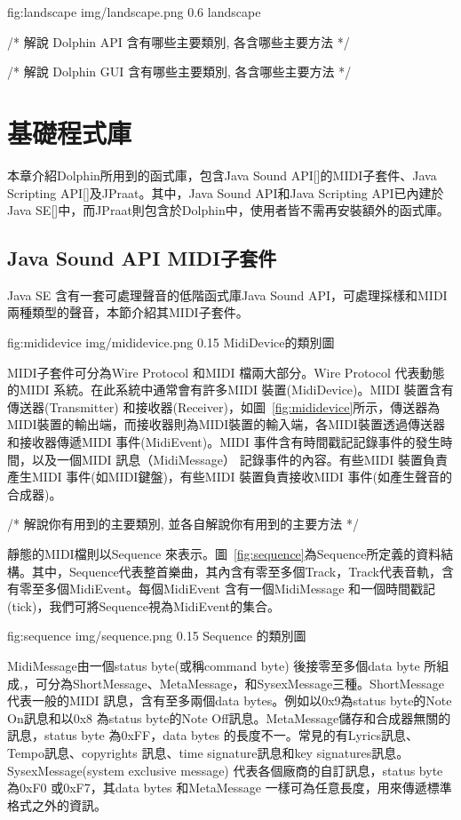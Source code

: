\documentclass[12pt,a4paper,oneside]{report}
\begin{document}
\figurewithcaption
{fig:landscape}
{img/landscape.png}
{0.6}
{landscape}


/* 
解說 Dolphin API 含有哪些主要類別, 各含哪些主要方法
*/

/* 
解說 Dolphin GUI 含有哪些主要類別, 各含哪些主要方法
*/

\section{基礎程式庫} %

本章介紹Dolphin所用到的函式庫，包含Java Sound API[]的MIDI子套件、Java Scripting API[]及JPraat。其中，Java Sound API和Java Scripting API已內建於Java SE[]中，而JPraat則包含於Dolphin中，使用者皆不需再安裝額外的函式庫。

\subsection{Java Sound API MIDI子套件}

Java SE 含有一套可處理聲音的低階函式庫Java Sound API，可處理採樣和MIDI兩種類型的聲音，本節介紹其MIDI子套件。

\figurewithcaption
{fig:mididevice}
{img/mididevice.png}
{0.15}
{MidiDevice的類別圖}

MIDI子套件可分為Wire Protocol 和MIDI 檔兩大部分。Wire Protocol 代表動態的MIDI 系統。在此系統中通常會有許多MIDI 裝置(MidiDevice)。MIDI 裝置含有傳送器(Transmitter) 和接收器(Receiver)，如圖~\ref{fig:mididevice}所示，傳送器為MIDI裝置的輸出端，而接收器則為MIDI裝置的輸入端，各MIDI裝置透過傳送器和接收器傳遞MIDI 事件(MidiEvent)。MIDI 事件含有時間戳記記錄事件的發生時間，以及一個MIDI 訊息（MidiMessage） 記錄事件的內容。有些MIDI 裝置負責產生MIDI 事件(如MIDI鍵盤)，有些MIDI 裝置負責接收MIDI 事件(如產生聲音的合成器)。

/*
     解說你有用到的主要類別, 並各自解說你有用到的主要方法
*/


靜態的MIDI檔則以Sequence 來表示。圖~\ref{fig:sequence}為Sequence所定義的資料結構。其中，Sequence代表整首樂曲，其內含有零至多個Track，Track代表音軌，含有零至多個MidiEvent。每個MidiEvent 含有一個MidiMessage 和一個時間戳記(tick)，我們可將Sequence視為MidiEvent的集合。


\figurewithcaption
{fig:sequence}
{img/sequence.png}
{0.15}
{Sequence 的類別圖}

MidiMessage由一個status byte(或稱command byte) 後接零至多個data byte 所組成,，可分為ShortMessage、MetaMessage，和SysexMessage三種。ShortMessage代表一般的MIDI 訊息，含有至多兩個data bytes。例如以0x9為status byte的Note On訊息和以0x8 為status byte的Note Off訊息。MetaMessage儲存和合成器無關的訊息，status byte 為0xFF，data bytes 的長度不一。常見的有Lyrics訊息、Tempo訊息、copyrights 訊息、time signature訊息和key signatures訊息。SysexMessage(system exclusive message) 代表各個廠商的自訂訊息，status byte 為0xF0 或0xF7，其data bytes 和MetaMessage 一樣可為任意長度，用來傳遞標準格式之外的資訊。
\end{document}
